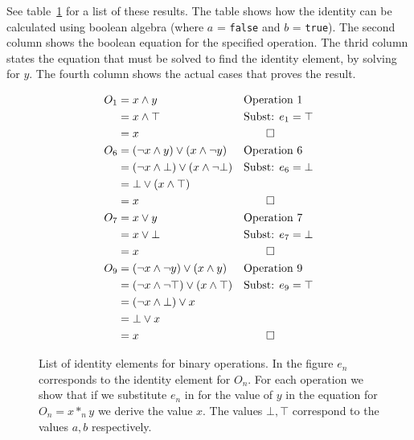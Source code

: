 \documentclass[draft,twoside]{amsart}
\newcommand{\ltrue}{\top}
\newcommand{\lfalse}{\bot}
\begin{document}
\begin{enumerate}
   See table~\ref{fig:bool_ids} for a list of these results. The table shows
   how the identity can be calculated using boolean algebra (where $a$ =
   \verb=false= and $b$ = \verb=true=). The second column shows the boolean
   equation for the specified operation. The thrid column states the 
   equation that must be solved to find the identity element, by solving
   for $y$. The fourth column shows the actual cases that proves the result.
   \begin{figure}
      \caption{List of identity elements for binary operations. In the figure
      $e_n$ corresponds to the identity element for $O_n$. For each operation
      we show that if we substitute $e_n$ in for the value of $y$ in the 
      equation for $O_n = x *_n y$ we derive the value $x$. The values
      $\lfalse, \ltrue$ correspond to the values $a, b$ respectively.}
      \label{fig:bool_ids}
      \begin{align*}
      O_1&=  x \land y  && \text{Operation 1}    \\
	 & = x \land \ltrue  && \text{Subst: } e_1 = \ltrue \\
	 & = x               && \qed                  \\
      O_6& = (\lnot x \land y) \lor (x \land \lnot y)
	                     && \text{Operation 6}    \\
	 & = (\lnot x \land \lfalse) \lor (x \land \lnot \lfalse)
	                     && \text{Subst: } e_6 = \lfalse \\
	 & = \lfalse \lor (x \land \ltrue)            \\
	 & = x               && \qed                  \\
      O_7& = x \lor y    && \text{Operation 7}    \\
	 & = x \lor \lfalse  && \text{Subst: } e_7 = \lfalse\\
	 & = x               && \qed                  \\
      O_9& = (\lnot x \land \lnot y) \lor (x \land y)
	                     && \text{Operation 9}    \\
	 & = (\lnot x \land \lnot \ltrue) \lor (x \land \ltrue)
	                     && \text{Subst: } e_9 = \ltrue \\
	 & = (\lnot x \land \lfalse) \lor x           \\
	 & = \lfalse \lor x                           \\
	 & = x               && \qed
      \end{align*}
   \end{figure}


\end{enumerate}
\end{document}
